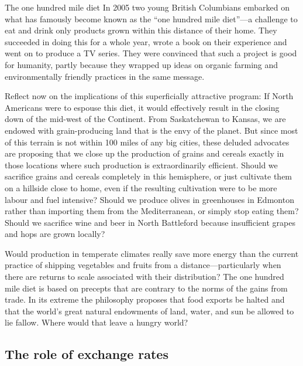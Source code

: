 \begin{ApplicationBox}{The one hundred mile diet}\label{app:ch15app1}
In 2005 two young British Columbians embarked on what has famously become known as the “one hundred mile diet”---a challenge to eat and drink only products grown within this distance of their home. They succeeded in doing this for a whole year, wrote a book on their experience and went on to produce a TV series. They were convinced that such a project is good for humanity, partly because they wrapped up ideas on organic farming and environmentally friendly practices in the same message.

\bigskip
Reflect now on the implications of this superficially attractive program: If North Americans were to espouse this diet, it would effectively result in the closing down of the mid-west of the Continent. From Saskatchewan to Kansas, we are endowed with grain-producing land that is the envy of the planet. But since most of this terrain is not within 100 miles of any big cities, these deluded advocates are proposing that we close up the production of grains and cereals exactly in those locations where such production is extraordinarily efficient. Should we sacrifice grains and cereals completely in this hemisphere, or just cultivate them on a hillside close to home, even if the resulting cultivation were to be more labour and fuel intensive? Should we produce olives in greenhouses in Edmonton rather than importing them from the Mediterranean, or simply stop eating them? Should we sacrifice wine and beer in North Battleford because insufficient grapes and hops are grown locally?

\bigskip
Would production in temperate climates really save more energy than the current practice of shipping vegetables and fruits from a distance---particularly when there are returns to scale associated with their distribution? The one hundred mile diet is based on precepts that are contrary to the norms of the gains from trade. In its extreme the philosophy proposes that food exports be halted and that the world's great natural endowments of land, water, and sun be allowed to lie fallow. Where would that leave a hungry world? 
\end{ApplicationBox}

\subsection*{The role of exchange rates}

